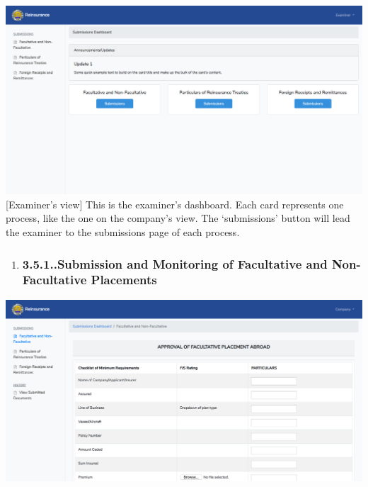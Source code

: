 \documentclass{article}
\begin{document}
\includegraphics[keepaspectratio=true]{up-ic-screens/image191}{}[Examiner’s view] This is the examiner’s dashboard. Each
card represents one process, like the one on the company’s view. The
‘submissions’ button will lead the examiner to the submissions page of
each process.%

\begin{enumerate}[noitemsep,topsep=\mdcompacttopsep]%

\item{}
\subsubsection{3.5.1.\hspace*{0.5em}.Submission and Monitoring of Facultative and Non-Facultative Placements}\label{sec-submission-and-monitoring-of-facultative-and-non-facultative-placements}%
\end{enumerate}%

\noindent{}\includegraphics[keepaspectratio=true]{up-ic-screens/image65}{}%
\end{document}
